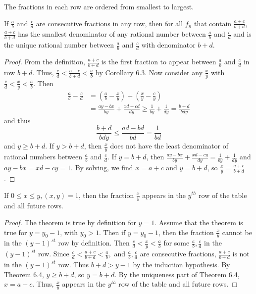 \documentclass{ximera}
\begin{document}
\begin{corollary}
The fractions in each row are ordered from smallest to largest.
\end{corollary}

\begin{theorem}
 If $\frac{a}{b}$ and $\frac{c}{d}$ are consecutive fractions in any row, then for all $f_n$ that contain $\frac{a+c}
 {b+d}$, $\frac{a+c}{b+d}$ has the smallest denominator of any rational number between $\frac{a}{b}$ and $\frac{c}{d}$ and is the unique rational number between $\frac{a}{b}$ and $\frac{c}{d}$ with denominator $b+d$.
 \end{theorem} 
 
\begin{proof}
 From the definition, $\frac{a+c}{b+d}$ is the first fraction to appear between $\frac{a}{b}$ and $\frac{c}{d}$ in row $b+d$. Thus, $\frac{c}{d}<\frac{a+c}{b+d}<\frac{a}{b}$ by Corollary 6.3. Now consider any $\frac{x}{y}$ with $\frac{c}{d}<\frac{x}{y}<\frac{a}{b}$. Then 
 \begin{align*}\frac{a}{b}-\frac{c}{d}&=\left(\frac{a}{b}-\frac{x}{y}\right)+\left(\frac{x}{y}-\frac{c}{y}\right)\\
 &=\frac{ay-bx}{by}+\frac{xd-cd}{dy}\geq \frac{1}{by}+\frac{1}{dy}=\frac{b+d}{bdy}
 \end{align*}
 and thus \[\frac{b+d}{bdy}\leq \frac{ad-bd}{bd}=\frac{1}{bd}\] and $y\geq b+d$. If $y>b+d$, then $\frac{x}{y}$ does not have the least denominator of rational numbers between $\frac{a}{b}$ and $\frac{c}{d}$. If $y=b+d$, then $\frac{ay-bx}{by}+\frac{xd-cy}{dy}= \frac{1}{by}+\frac{1}{dy}$ and $ay-bx=xd-cy=1$. By solving, we find $x=a+c$ and $y=b+d$, so $\frac{x}{y}=\frac{a+c}{b+d}$.
\end{proof}

\begin{theorem}
If $0\leq x\leq y, (x,y)=1$, then the fraction $\frac{x}{y}$ appears in the $y^{th}$ row of the table and all future rows.
\end{theorem}
\begin{proof}
 The theorem is true by definition for $y=1$. Assume that the theorem is true for $y=y_0-1$, with $y_0>1$. Then if $y=y_0-1$, then the fraction $\frac{x}{y}$ cannot be in the $(y-1)^{st}$ row by definition. Then $\frac{c}{d}<\frac{x}{y}<\frac{a}{b}$ for some $\frac{a}{b}, \frac{c}{d}$ in the $(y-1)^{st}$ row. Since $\frac{c}{d}<\frac{a+c}{b+d}<\frac{a}{b},$ and  $\frac{a}{b}, \frac{c}{d}$ are consecutive fractions, $\frac{a+c}{b+d}$ is not in the $(y-1)^{st}$  row. Thus $b+d>y-1$ by the induction hypothesis. By Theorem 6.4, $y\geq b+d$, so $y=b+d$. By the uniqueness part of Theorem 6.4, $x=a+c$. Thus, $\frac{x}{y}$ appears in the $y^{th}$ row of the table and all future rows.
\end{proof}
\end{document}
